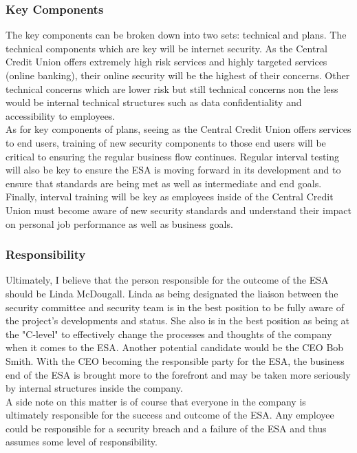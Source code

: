 \documentclass[paper=a4, fontsize=11pt]{scrartcl} %
\numberwithin{equation}{section} %
\numberwithin{figure}{section} %
\numberwithin{table}{section} %
\begin{document}

\subsubsection{Key Components}
The key components can be broken down into two sets: technical and plans. The 
technical components which are key will be internet security. As the Central
Credit Union offers extremely high risk services and highly targeted services
(online banking), their online security will be the highest of their concerns. 
Other technical concerns which are lower risk but still technical concerns non
the less would be internal technical structures such as data confidentiality
and accessibility to employees.\\

As for key components of plans, seeing as the Central Credit Union offers 
services to end users, training of new security components to those end users
will be critical to ensuring the regular business flow continues. Regular
interval testing will also be key to ensure the ESA is moving forward in its
development and to ensure that standards are being met as well as intermediate
and end goals. Finally, interval training will be key as employees inside of
the Central Credit Union must become aware of new security standards and 
understand their impact on personal job performance as well as business goals.



\subsubsection{Responsibility}
Ultimately, I believe that the person responsible for the outcome of the ESA
should be Linda McDougall. Linda as being designated the liaison between the
security committee and security team is in the best position to be fully aware
of the project's developments and status. She also is in the best position as
being at the "C-level" to effectively change the processes and thoughts of the
company when it comes to the ESA. Another potential candidate would be the CEO
Bob Smith. With the CEO becoming the responsible party for the ESA, the business
end of the ESA is brought more to the forefront and may be taken more seriously
by internal structures inside the company.\\

A side note on this matter is of course that everyone in the company is
ultimately responsible for the success and outcome of the ESA. Any employee could
be responsible for a security breach and a failure of the ESA and thus assumes
some level of responsibility.
\end{document}
